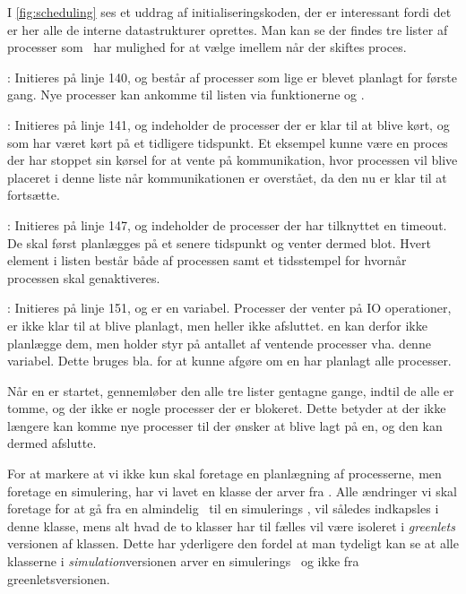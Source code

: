  I \cref{fig:scheduling} ses et uddrag af initialiseringskoden, der er interessant fordi det er her alle de interne datastrukturer oprettes. Man kan se der findes tre lister af processer som \sched ~har mulighed for at vælge imellem når der skiftes proces.  
 \begin{list}
 \tightlist 
 \item {}: Initieres på linje 140, og består af processer som lige er blevet planlagt for første gang. Nye processer kan ankomme til listen  via funktionerne  og .
 \item {}: Initieres på linje 141, og indeholder de processer der er klar til at blive kørt, og som har været kørt på et tidligere tidspunkt. Et eksempel kunne være en proces der har stoppet sin kørsel for at vente på kommunikation, hvor processen vil blive placeret i denne liste når kommunikationen er overstået, da den nu er klar til at fortsætte. 
 \item {}: Initieres på linje 147, og indeholder de processer der har tilknyttet en timeout. De skal først planlægges på et senere tidspunkt og venter dermed blot. Hvert element i listen består både af processen samt et tidsstempel for hvornår processen skal genaktiveres. 
 \item {}: Initieres på linje 151, og er en variabel. Processer der venter på IO operationer, er ikke klar til at blive planlagt, men heller ikke afsluttet. \sched en kan derfor ikke planlægge dem, men holder styr på antallet af ventende processer vha. denne variabel. Dette bruges bla. for at kunne afgøre om \sched en har planlagt alle processer.
\end{list}

Når \sched en er startet, gennemløber den alle tre lister gentagne gange, indtil de alle er tomme, og der ikke er nogle processer der er blokeret. Dette betyder at der ikke længere kan komme nye processer til der ønsker at blive lagt på \sched en, og den kan dermed afslutte.

For at markere at vi ikke kun skal foretage en planlægning
af processerne, men foretage en simulering, har vi lavet en
 klasse der arver fra . Alle ændringer
vi skal foretage for at gå fra en almindelig \sched ~til en simulerings
\sched, vil således indkapsles i denne klasse, mens alt hvad de to
klasser har til fælles vil være isoleret i \emph{greenlets} versionen af
 klassen. Dette har yderligere den fordel at man tydeligt kan se
at alle klasserne i \emph{simulation}versionen arver en simulerings \sched ~og
ikke  fra greenletsversionen.


